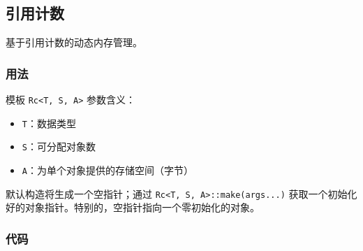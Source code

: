 \subsection{引用计数}

基于引用计数的动态内存管理。

\subsubsection{用法}

模板 \lstinline{Rc<T, S, A>} 参数含义：

\begin{itemize}
    \item \lstinline{T}：数据类型
    \item \lstinline{S}：可分配对象数
    \item \lstinline{A}：为单个对象提供的存储空间（字节）
\end{itemize}

默认构造将生成一个空指针；通过 \lstinline{Rc<T, S, A>::make(args...)} 获取一个初始化好的对象指针。特别的，空指针指向一个零初始化的对象。

\subsubsection{代码}


